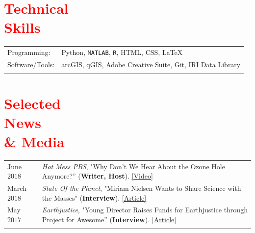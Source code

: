 \documentclass[margin, line, palatino, courier, 10pt]{res}
\begin{document}
\begin{resume}

\section{\sc \textcolor{Red}{\large{Technical \\ Skills}}}
\vspace*{0.05in}
\begin{tabular}{@{}p{1in}p{4in}}

Programming:& Python, \texttt{MATLAB}, \texttt{R}, HTML, CSS, \LaTeX \\
Software/Tools:&  arcGIS, qGIS, Adobe Creative Suite, Git, IRI Data Library \\\\

\end{tabular}


\section{\sc \textcolor{Red}{\large{Selected  \\News \\ \& Media}}}
\vspace*{0.04in}
\begin{tabular}{@{}p{1in}p{4in}}
June $2018$ & \textit{Hot Mess PBS}, "Why Don’t We Hear About the Ozone Hole Anymore?'' (\textbf{Writer, Host}). \href{https://www.youtube.com/watch?v=mQpa_NYXUGI}{[Video]}\\

March $2018$ & \textit{State Of the Planet}, "Miriam Nielsen Wants to Share Science with the Masses" (\textbf{Interview}). \href{https://blogs.ei.columbia.edu/2018/03/05/miriam-nielsen-science-communications/}{[Article]}\\

May $2017$ & \textit{Earthjustice}, "Young Director Raises Funds for Earthjustice through Project for Awesome'' (\textbf{Interview}). \href{http://earthjustice.org/blog/2017-may/director-raises-funds-for-earthjustice-through-project-for-awesome}{[Article]}\\


\\
\end{tabular}


\end{resume}
\end{document}
